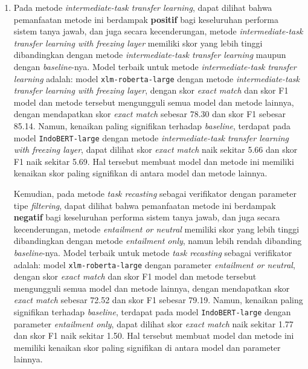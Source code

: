 \begin{enumerate}
	
 \item {}
	
 Pada metode \emph{intermediate-task transfer learning}, dapat dilihat bahwa pemanfaatan metode ini berdampak \textbf{positif} bagi keseluruhan performa sistem tanya jawab, dan juga secara kecenderungan, metode \emph{intermediate-task transfer learning with freezing layer} memiliki skor yang lebih tinggi dibandingkan dengan metode \emph{intermediate-task transfer learning} maupun dengan \emph{baseline}-nya. Model terbaik untuk metode \emph{intermediate-task transfer learning} adalah: model \texttt{xlm-roberta-large} dengan metode \emph{intermediate-task transfer learning with freezing layer}, dengan skor \emph{exact match} dan skor F1 model dan metode tersebut mengungguli semua model dan metode lainnya, dengan mendapatkan skor \emph{exact match} sebesar 78.30 dan skor F1 sebesar 85.14. Namun, kenaikan paling signifikan terhadap \emph{baseline}, terdapat pada model \texttt{IndoBERT-large} dengan metode \emph{intermediate-task transfer learning with freezing layer}, dapat dilihat skor \emph{exact match} naik sekitar 5.66 dan skor F1 naik sekitar 5.69. Hal tersebut membuat model dan metode ini memiliki kenaikan skor paling signifikan di antara model dan metode lainnya. 
 
 Kemudian, pada metode \emph{task recasting} sebagai verifikator dengan parameter tipe \emph{filtering}, dapat dilihat bahwa pemanfaatan metode ini berdampak \textbf{negatif} bagi keseluruhan performa sistem tanya jawab, dan juga secara kecenderungan, metode \emph{entailment or neutral} memiliki skor yang lebih tinggi dibandingkan dengan metode \emph{entailment only}, namun lebih rendah dibanding \emph{baseline}-nya. Model terbaik untuk metode \emph{task recasting} sebagai verifikator adalah: model \texttt{xlm-roberta-large} dengan parameter \emph{entailment or neutral}, dengan skor \emph{exact match} dan skor F1 model dan metode tersebut mengungguli semua model dan metode lainnya, dengan mendapatkan skor \emph{exact match} sebesar 72.52 dan skor F1 sebesar 79.19. Namun, kenaikan paling signifikan terhadap \emph{baseline}, terdapat pada model \texttt{IndoBERT-large} dengan parameter \emph{entailment only}, dapat dilihat skor \emph{exact match} naik sekitar 1.77 dan skor F1 naik sekitar 1.50. Hal tersebut membuat model dan metode ini memiliki kenaikan skor paling signifikan di antara model dan parameter lainnya.


\end{enumerate}

